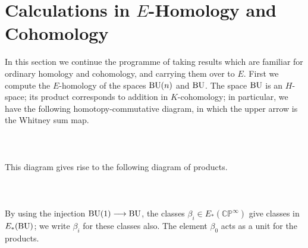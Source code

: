 \documentclass[../main]{subfiles}
\begin{document}
\label{sec:p2c4}
\renewcommand{\labelenumi}{(\roman{enumi})}

\chapter{Calculations in \texorpdfstring{$E$}{E}-Homology and Cohomology}


In this section we continue the programme of taking results which are familiar for ordinary homology and cohomology, and carrying them over to $E$. First we compute the $E$-homology of the spaces $\mathrm{BU}(n)$ and $\mathrm{BU}$. The space $\mathrm{BU}$ is an $H$-space; its product corresponds to addition in $K$-cohomology; in particular, we have the following homotopy-commutative diagram, in which the upper arrow is the Whitney sum map.
~\\~\\
~\\~\\
This diagram gives rise to the following diagram of products.
~\\~\\
~\\~\\
By using the injection $\mathrm{BU}(1)\longrightarrow \mathrm{BU}$, the classes $\beta_i\in E_\ast(\mathbb{CP}^\infty)$ give classes in $E_\ast(\mathrm{BU})$; we write $\beta_i$ for these classes also. The element $\beta_0$ acts as a unit for the products.
\end{document}
